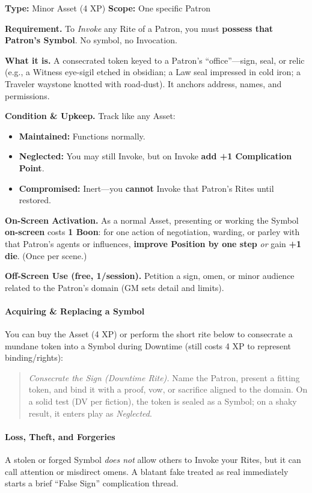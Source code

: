 \documentclass[12pt,twoside]{book}
\begin{document}
\textbf{Type:} Minor Asset (4 XP) \hfill \textbf{Scope:} One specific Patron

\textbf{Requirement.} To \emph{Invoke} any Rite of a Patron, you must \textbf{possess that Patron’s Symbol}. No symbol, no Invocation.

\textbf{What it is.} A consecrated token keyed to a Patron’s “office”—sign, seal, or relic (e.g., a Witness eye-sigil etched in obsidian; a Law seal impressed in cold iron; a Traveler waystone knotted with road-dust). It anchors address, names, and permissions.

\textbf{Condition \& Upkeep.} Track like any Asset:
\begin{itemize}
  \item \textbf{Maintained:} Functions normally.
  \item \textbf{Neglected:} You may still Invoke, but on Invoke \textbf{add +1 Complication Point}.
  \item \textbf{Compromised:} Inert—you \textbf{cannot} Invoke that Patron’s Rites until restored.
\end{itemize}

\textbf{On-Screen Activation.} As a normal Asset, presenting or working the Symbol \textbf{on-screen} costs \textbf{1 Boon}: for one action of negotiation, warding, or parley with that Patron’s agents or influences, \textbf{improve Position by one step} \emph{or} gain \textbf{+1 die}. (Once per scene.)

\textbf{Off-Screen Use (free, 1/session).} Petition a sign, omen, or minor audience related to the Patron’s domain (GM sets detail and limits).

\paragraph{Acquiring \& Replacing a Symbol}
You can buy the Asset (4 XP) or perform the short rite below to consecrate a mundane token into a Symbol during Downtime (still costs 4 XP to represent binding/rights):
\begin{quote}
\emph{Consecrate the Sign (Downtime Rite).} Name the Patron, present a fitting token, and bind it with a proof, vow, or sacrifice aligned to the domain. On a solid test (DV per fiction), the token is sealed as a Symbol; on a shaky result, it enters play as \emph{Neglected}.
\end{quote}

\paragraph{Loss, Theft, and Forgeries}
A stolen or forged Symbol \emph{does not} allow others to Invoke your Rites, but it can call attention or misdirect omens. A blatant fake treated as real immediately starts a brief “False Sign” complication thread.
\end{document}
